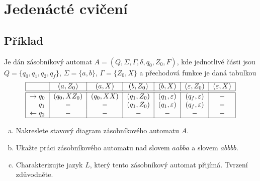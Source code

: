 \section{Jedenácté cvičení}

\subsection{Příklad}
Je dán zásobníkový automat $A = (Q, \Sigma, \Gamma, \delta, q_0, Z_0, F)$, kde jednotlivé části jsou 
$Q = \{q_0, q_1, q_2, q_f\}$, $\Sigma = \{a, b\}$, $\Gamma =\{Z_0, X\}$ a přechodová funkce je daná tabulkou
\[
\begin{tabular}{|r|c|c|c|c|c|c|}
    \hline
    & $(a, Z_0)$ & $(a, X)$ & $(b, Z_0)$ & $(b, X)$ & $(\varepsilon, Z_0)$ & $(\varepsilon, X)$\\
    \hline
    \hline
    $\rightarrow q_0$& $(q_0, X Z_0)$ & $(q_0, XX)$ & $(q_1, Z_0)$ & $(q_1, \varepsilon)$ & $(q_f, \varepsilon)$ & $-$\\
    $q_1$            & $-$            & $-$         & $(q_1, Z_0)$ & $(q_1, \varepsilon)$ & $(q_f, \varepsilon)$ & $-$\\
    $\leftarrow q_2$ & $-$& $-$& $-$ & $-$ & $-$ & $-$\\
    \hline
\end{tabular}
\]

\begin{enumerate}[a), noitemsep]
    \item Nakreslete stavový diagram zásobníkového automatu $A$.
    \item Ukažte práci zásobníkového automatu nad slovem $aabba$ a slovem $abbbb$.
    \item Charakterizujte jazyk $L$, který tento zásobníkový automat přijímá. Tvrzení zdůvodněte.
\end{enumerate}

